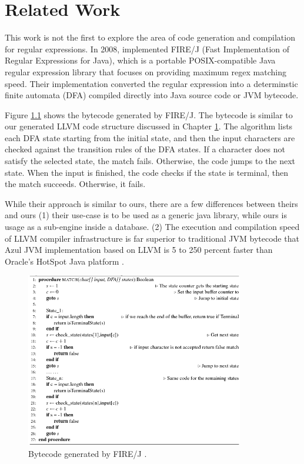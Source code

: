 \chapter{Related Work}\label{chapter:related_work}
This work is not the first to explore the area of code generation and compilation for regular expressions. In 2008, \citet{firejpaper} implemented FIRE/J (Fast Implementation of Regular Expressions for Java), which is a portable POSIX-compatible Java regular expression library that focuses on providing maximum regex matching speed. Their implementation converted the regular expression into a determinstic finite automata (DFA) compiled directly into Java source code or JVM bytecode.

Figure \ref{fig:firejpaper} shows the bytecode generated by FIRE/J. The bytecode is similar to our generated LLVM code structure discussed in Chapter \ref{chapter:related_work}. The algorithm lists each DFA state starting from the initial state, and then the input characters are checked against the transition rules of the DFA states. If a character does not satisfy the selected state, the match fails. Otherwise, the code jumps to the next state. When the input is finished, the code checks if the state is terminal, then the match succeeds. Otherwise, it fails.

While their approach is similar to ours, there are a few differences between theirs and ours (1) their use-case is to be used as a generic java library, while ours is usage as a sub-engine inside a database. (2) The execution and compilation speed of LLVM compiler infrastructure is far superior to traditional JVM bytecode that Azul JVM implementation based on LLVM is 5 to 250 percent faster than Oracle's HotSpot Java platform \cite{azul}.

\begin{figure}[htbp]
\includegraphics[width=0.85\textwidth]{imgs/alg-byte-firej.png}
\caption{Bytecode generated by FIRE/J \cite{firejpaper}.}\label{fig:firejpaper}
\end{figure}

